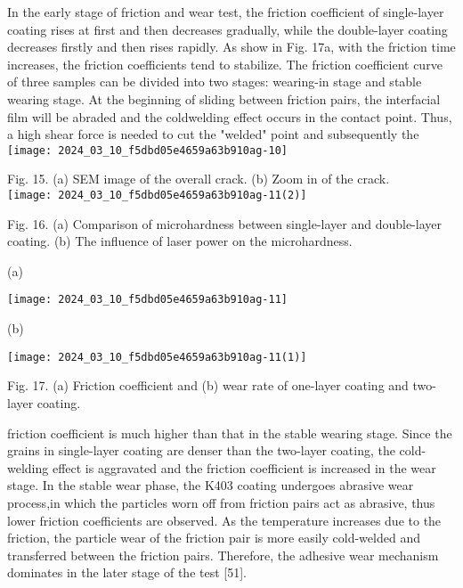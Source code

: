 \documentclass[10pt]{article}
\begin{document}
In the early stage of friction and wear test, the friction coefficient of single-layer coating rises at first and then decreases gradually, while the double-layer coating decreases firstly and then rises rapidly. As show in Fig. 17a, with the friction time increases, the friction coefficients tend to stabilize. The friction coefficient curve of three samples can be divided into two stages: wearing-in stage and stable wearing stage. At the beginning of sliding between friction pairs, the interfacial film will be abraded and the coldwelding effect occurs in the contact point. Thus, a high shear force is needed to cut the "welded" point and subsequently the\\
\texttt{[image: 2024\_03\_10\_f5dbd05e4659a63b910ag-10]}

Fig. 15. (a) SEM image of the overall crack. (b) Zoom in of the crack.\\
\texttt{[image: 2024\_03\_10\_f5dbd05e4659a63b910ag-11(2)]}

Fig. 16. (a) Comparison of microhardness between single-layer and double-layer coating. (b) The influence of laser power on the microhardness.

(a)

\begin{center}
\texttt{[image: 2024\_03\_10\_f5dbd05e4659a63b910ag-11]}
\end{center}

(b)

\begin{center}
\texttt{[image: 2024\_03\_10\_f5dbd05e4659a63b910ag-11(1)]}
\end{center}

Fig. 17. (a) Friction coefficient and (b) wear rate of one-layer coating and two-layer coating.

friction coefficient is much higher than that in the stable wearing stage. Since the grains in single-layer coating are denser than the two-layer coating, the cold-welding effect is aggravated and the friction coefficient is increased in the wear stage. In the stable wear phase, the K403 coating undergoes abrasive wear process,in which the particles worn off from friction pairs act as abrasive, thus lower friction coefficients are observed. As the temperature increases due to the friction, the particle wear of the friction pair is more easily cold-welded and transferred between the friction pairs. Therefore, the adhesive wear mechanism dominates in the later stage of the test [51].
\end{document}
